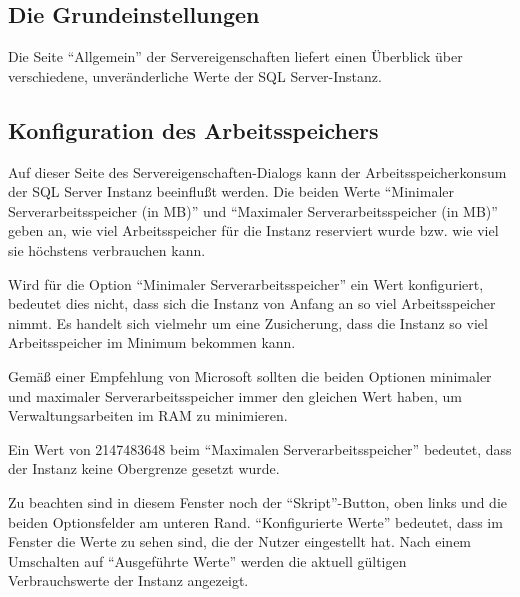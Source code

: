       \subsection{Die Grundeinstellungen}
        Die Seite \enquote{Allgemein} der Servereigenschaften liefert einen
        Überblick über verschiedene, unveränderliche Werte der SQL
        Server-Instanz.
      \subsection{Konfiguration des Arbeitsspeichers}
        Auf dieser Seite des Servereigenschaften-Dialogs kann der
        Arbeitsspeicherkonsum der SQL Server Instanz beeinflußt werden. Die
        beiden Werte \enquote{Minimaler Serverarbeitsspeicher (in MB)} und
        \enquote{Maximaler Serverarbeitsspeicher (in MB)} geben an, wie viel
        Arbeitsspeicher f\"ur die Instanz reserviert wurde bzw. wie viel sie
        höchstens verbrauchen kann.
        \begin{merke}
          Wird f\"ur die Option \enquote{Minimaler Serverarbeitsspeicher} ein
          Wert konfiguriert, bedeutet dies nicht, dass sich die Instanz von
          Anfang an so viel Arbeitsspeicher nimmt. Es handelt sich vielmehr um
          eine Zusicherung, dass die Instanz so viel Arbeitsspeicher
          im Minimum bekommen kann.
        \end{merke}
        Gemäß einer Empfehlung von Microsoft sollten die beiden Optionen
        minimaler und maximaler Serverarbeitsspeicher immer den gleichen Wert
        haben, um Verwaltungsarbeiten im RAM zu minimieren.
        \begin{merke}
          Ein Wert von 2147483648 beim \enquote{Maximalen
          Serverarbeitsspeicher} bedeutet, dass der Instanz keine Obergrenze
          gesetzt wurde.
        \end{merke} 
        Zu beachten sind in diesem Fenster noch der \enquote{Skript}-Button,
        oben links und die beiden Optionsfelder am unteren Rand.
        \enquote{Konfigurierte Werte} bedeutet, dass im Fenster die Werte zu
        sehen sind, die der Nutzer eingestellt hat. Nach einem Umschalten auf
        \enquote{Ausgeführte Werte} werden die aktuell gültigen Verbrauchswerte
        der Instanz angezeigt.
        
